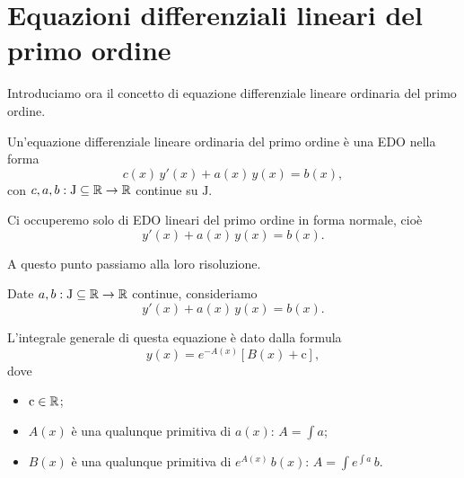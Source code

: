 \documentclass[../../analisi2]{subfiles}
\begin{document}
    \chapter{Equazioni differenziali lineari del primo ordine}

        Introduciamo ora il concetto di equazione differenziale lineare ordinaria del primo ordine.

        \begin{definizione}
            Un'equazione differenziale lineare ordinaria del primo ordine è una EDO nella forma
            \[
                c(x) \, y'(x) + a(x) \, y(x) = b(x),
            \]
            con \(c, a, b : \mathrm{J} \subseteq \mathbb{R} \to \mathbb{R}\) continue su \(\mathrm{J}\).

            Ci occuperemo solo di EDO lineari del primo ordine in forma normale, cioè
            \[
                y'(x) + a(x) \, y(x) = b(x).
            \]
        \end{definizione}

        A questo punto passiamo alla loro risoluzione.

        \begin{teorema}
            Date \(a, b : \mathrm{J} \subseteq \mathbb{R} \to \mathbb{R}\) continue, consideriamo
            \[
                y'(x) + a(x) \, y(x) = b(x).
            \]

            L'integrale generale di questa equazione è dato dalla formula
            \[
                y(x) = e^{-A(x)} \left[B(x) + \mathrm{c}\right],
            \]
            dove
            \begin{itemize}
                \item \(\mathrm{c} \in \mathbb{R}\);
                \item \(A(x)\) è una qualunque primitiva di \(a(x)\): \(A = \int \! a\);
                \item \(B(x)\) è una qualunque primitiva di \(e^{A(x)} \, b(x)\): \(A = \int \! e^{\int \! a} \, b\).
            \end{itemize}
        \end{teorema}
            
\end{document}
